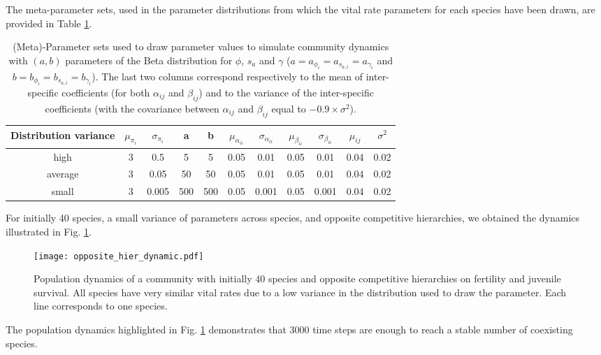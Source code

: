 \documentclass{article}
\begin{document}
The meta-parameter sets, used in the parameter distributions from which the vital rate parameters for each species have been drawn, are provided in Table \ref{tab:parameter_law_community_simul}.

\begin{table}[H]
    \centering
\begin{tabular}{|c|cc|cc|cc|cc|cc|}
  \hline
Distribution variance & $\mu_{\pi_i}$ & $\sigma_{\pi_i}$ & a & b & $\mu_{\alpha_{ii}}$ & $\sigma_{\alpha_{ii}}$ & $\mu_{\beta_{ii}}$ & $\sigma_{\beta_{ii}}$ & $\mu_{ij}$ & $\sigma^2$\\ 
  \hline
high & 3 & 0.5 & 5 & 5 & 0.05 & 0.01 & 0.05 & 0.01 & 0.04 & 0.02\\ 
average & 3 & 0.05 & 50 & 50 & 0.05 & 0.01 & 0.05 & 0.01 & 0.04 & 0.02\\ 
small & 3 & 0.005 & 500 & 500 & 0.05 & 0.001 & 0.05 & 0.001 & 0.04 & 0.02\\ 
   \hline
\end{tabular}

\caption{(Meta)-Parameter sets used to draw parameter values to simulate community dynamics with $(a,b)$ parameters of the Beta distribution for $\phi$, $s_{a}$ and $\gamma$ ($a = a_{\phi_i} = a_{s_{a,i}} = a_{\gamma_i}$ and $b= b_{\phi_i} = b_{s_{a,i}} = b_{\gamma_i}$). The last two columns correspond respectively to the mean of inter-specific coefficients (for both $\alpha_{ij}$ and $\beta_{ij}$) and to the variance of the inter-specific coefficients (with the covariance between $\alpha_{ij}$ and $\beta_{ij}$ equal to $-0.9 \times \sigma^2$).}
\label{tab:parameter_law_community_simul}
\end{table}

For initially 40 species, a small variance of parameters across species, and opposite competitive hierarchies, we obtained the dynamics illustrated in Fig. \ref{fig:dynamic_community}.

\begin{figure}[H]
    \centering
    \texttt{[image: opposite\_hier\_dynamic.pdf]}
    \caption{Population dynamics of a community with initially 40 species and opposite competitive hierarchies on fertility and juvenile survival. All species have very similar vital rates due to a low variance in the distribution used to draw the parameter. Each line corresponds to one species.}
    \label{fig:dynamic_community}
\end{figure}

The population dynamics highlighted in Fig. \ref{fig:dynamic_community} demonstrates that 3000 time steps are enough to reach a stable number of coexisting species.
\end{document}
